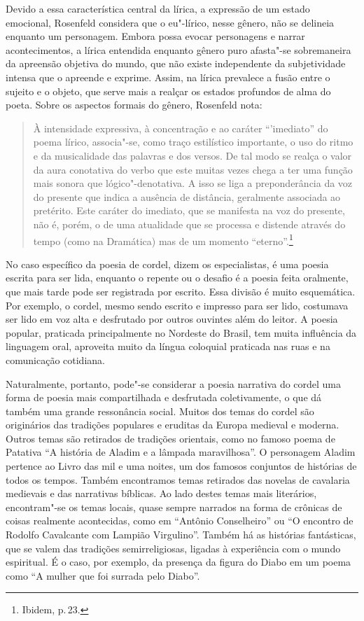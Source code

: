 Devido a essa característica central da lírica, a expressão de um estado emocional, Rosenfeld considera que o eu"-lírico, nesse gênero, não se delineia enquanto um personagem. Embora possa evocar personagens e narrar acontecimentos, a lírica entendida enquanto gênero puro afasta"-se sobremaneira da apreensão objetiva do mundo, que não existe independente da subjetividade intensa que o apreende e exprime. Assim, na lírica prevalece a fusão entre o sujeito e o objeto, que serve mais a realçar os estados profundos de alma do poeta.
Sobre os aspectos formais do gênero, Rosenfeld nota:

\begin{quote}
À intensidade expressiva, à concentração e ao caráter ``'imediato'' do poema lírico, associa"-se, como traço estilístico importante, o uso do ritmo e da musicalidade das palavras e dos versos. De tal modo se realça o valor da aura conotativa do verbo que este muitas vezes chega a ter uma função mais sonora que lógico"-denotativa. A isso se liga a preponderância da voz do presente que indica a ausência de distância, geralmente associada ao pretérito. Este caráter do imediato, que se manifesta na voz do presente, não é, porém, o de uma atualidade que se processa e distende através do tempo (como na Dramática) mas de um momento ``eterno''.\footnote{Ibidem, p.\,23.}
\end{quote}

No caso específico da poesia de cordel, dizem os especialistas, é uma poesia escrita para
ser lida, enquanto o repente ou o desafio é a poesia feita oralmente, que mais tarde pode
ser registrada por escrito. Essa divisão é muito esquemática. Por exemplo, o
cordel, mesmo sendo escrito e impresso para ser lido, costumava ser lido em
voz alta e desfrutado por outros ouvintes além do leitor. A poesia popular,
praticada principalmente no Nordeste do Brasil, tem muita influência da
linguagem oral, aproveita muito da língua coloquial praticada nas ruas e na
comunicação cotidiana. 

Naturalmente, portanto, pode"-se considerar a poesia narrativa do cordel uma
forma de poesia mais compartilhada e desfrutada coletivamente, o que dá também
uma grande ressonância social. Muitos dos temas do cordel são originários das
tradições populares e eruditas da Europa medieval e moderna. Outros temas são
retirados de tradições orientais, como no famoso poema de Patativa “A história de
Aladim e a lâmpada maravilhosa”. O personagem Aladim pertence ao Livro das mil
e uma noites, um dos famosos conjuntos de histórias de todos os tempos. Também
encontramos temas retirados das novelas de cavalaria medievais e das narrativas
bíblicas. Ao lado destes temas mais literários, encontram"-se os temas locais,
quase sempre narrados na forma de crônicas de coisas realmente acontecidas,
como em “Antônio Conselheiro” ou ``O encontro de Rodolfo Cavalcante com Lampião Virgulino''. Também há as histórias fantásticas, que se valem das tradições semirreligiosas, ligadas à experiência com o mundo espiritual. É o caso, por exemplo, da presença da figura do Diabo em um poema como ``A mulher que foi surrada pelo Diabo''.

